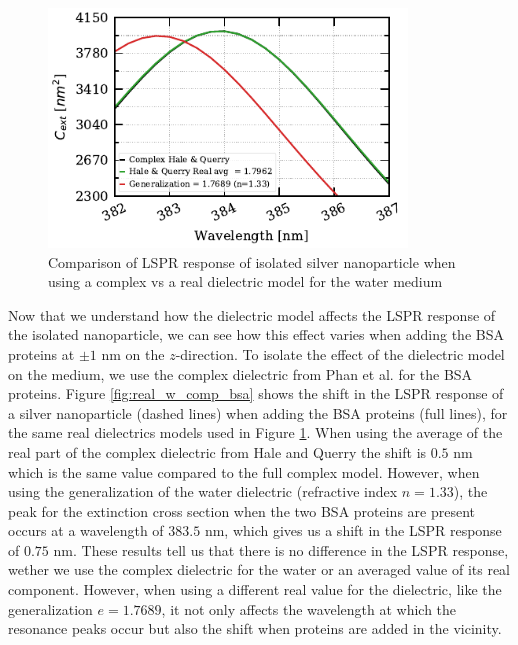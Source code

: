 \begin{figure} %
    \centering
    \includegraphics[width=0.85\textwidth]{iso_np_water_diel_study.pdf} 
    \caption{Comparison of LSPR response of isolated silver nanoparticle when using a complex 
     vs a real dielectric model for the water medium}
    \label{fig:iso_NP_diel}
 \end{figure}

Now that we understand how the dielectric model affects the LSPR response of the isolated nanoparticle, we can see how this 
effect varies when adding the BSA proteins at $\pm1$ nm on the $z$-direction. To isolate the effect of the dielectric model on the 
medium, we use the complex dielectric from Phan et al. \cite{PhanETal2013} for the BSA proteins. Figure \ref{fig:real_w_comp_bsa}
shows the shift in the LSPR response of a silver nanoparticle (dashed lines) when adding the BSA proteins (full lines), for the same 
real dielectrics models used in Figure \ref{fig:iso_NP_diel}. When using the average of the real part of the complex dielectric from 
Hale and Querry \cite{HaleQuerry1972} the shift is $0.5$ nm which is the same value compared to the full complex model. However, when using 
the generalization of the water dielectric (refractive index $n=1.33$), the peak for the extinction cross section when the two BSA proteins are
present occurs at a wavelength of $383.5$ nm, which gives us a shift in the LSPR response of $0.75$ nm. These results tell us that there is no 
difference in the LSPR response, wether we use the complex dielectric for the water or an averaged value of its real component. However, when using a
different real value for the dielectric, like the generalization $e=1.7689$, it not only affects the wavelength at which the resonance peaks occur
but also the shift when proteins are added in the vicinity. 

